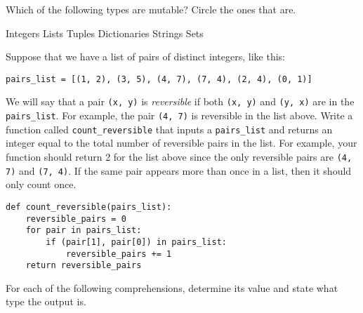 \documentclass[12pt,answers]{exam}
\begin{document}
\begin{questions}
\newpage
\question Which of the following types are mutable?  Circle the ones that are.
\begin{choices}
\choice Integers
\CorrectChoice Lists
\choice Tuples
\CorrectChoice Dictionaries
\choice Strings
\CorrectChoice Sets
\end{choices}
\smallskip
\question Suppose that we have a list of pairs of distinct integers, like this:
\begin{center}
\verb|pairs_list = [(1, 2), (3, 5), (4, 7), (7, 4), (2, 4), (0, 1)]| 
\end{center}
We will say that a pair \verb|(x, y)| is \emph{reversible} if both \verb|(x, y)| and \verb|(y, x)| are in the \verb|pairs_list|. For example, the pair \verb|(4, 7)| is reversible in the list above.  Write a function called \verb|count_reversible| that inputs a \verb|pairs_list| and returns an integer equal to the total number of reversible pairs in the list.  For example, your function should return 2 for the list above since the only reversible pairs are \verb|(4, 7)| and \verb|(7, 4)|.  If the same pair appears more than once in a list, then it should only count once. %
\begin{solution}
\begin{verbatim}
def count_reversible(pairs_list):
    reversible_pairs = 0
    for pair in pairs_list:
        if (pair[1], pair[0]) in pairs_list:
            reversible_pairs += 1
    return reversible_pairs
\end{verbatim}
\end{solution}

\vfill
\newpage

\question For each of the following comprehensions, determine its value and state what type the output is.  
\end{questions}
\end{document}
